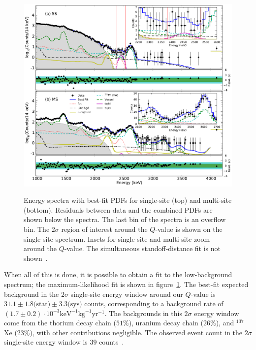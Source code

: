 \begin{figure}
\begin{center}
\includegraphics[keepaspectratio=true,width=\textwidth]{Energy_BestFit_frompaper.pdf}
\end{center}
\renewcommand{\baselinestretch}{1}
\small\normalsize
\begin{quote}
\caption{Energy spectra with best-fit PDFs for single-site (top) and multi-site (bottom).  Residuals between data and the combined PDFs are shown below the spectra.  The last bin of the spectra is an overflow bin.  The $2\sigma$ region of interest around the $Q$-value is shown on the single-site spectrum.  Insets for single-site and multi-site zoom around the $Q$-value.  The simultaneous standoff-distance fit is not shown~\cite{NewEXObb0nPaper_2014}.}
\label{fig:BestFitEnergyFromPaper}
\end{quote}
\end{figure}
\renewcommand{\baselinestretch}{2}
\small\normalsize

When all of this is done, it is possible to obtain a fit to the low-background spectrum; the maximum-likelihood fit is shown in figure~\ref{fig:BestFitEnergyFromPaper}.  The best-fit expected background in the $2\sigma$ single-site energy window around our $Q$-value is $31.1 \pm 1.8\text{(stat)} \pm 3.3\text{(sys)}$ counts, corresponding to a background rate of $(1.7 \pm 0.2)\cdot 10^{-3} \text{keV}^{-1} \text{kg}^{−1} \text{yr}^{−1}$.  The backgrounds in this $2\sigma$ energy window come from the thorium decay chain ($51\%$), uranium decay chain ($26\%$), and $^{137}$Xe ($23\%$), with other contributions negligible.  The observed event count in the $2\sigma$ single-site energy window is $39$ counts~\cite{NewEXObb0nPaper_2014}.

